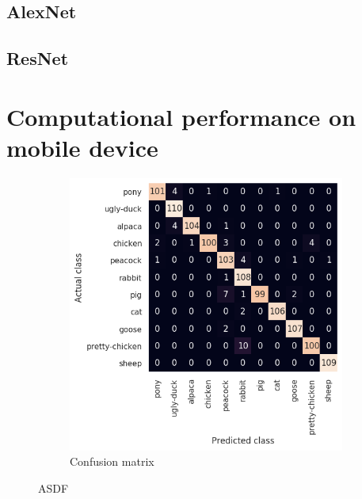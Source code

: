 \documentclass{l4proj}
\begin{document}
\subsection{AlexNet}

\subsection{ResNet}


\section{Computational performance on mobile device}


\begin{figure}[ht]
  \centering
  \begin{subfigure}[h!]{0.6\textwidth}
    \includegraphics[width=\textwidth]{images/evaluation/confusion/vis_fir_confusion.png}
    \caption{Confusion matrix}
    \label{fig:confusion}
  \end{subfigure}
  \caption{ASDF}
\end{figure}


\end{document}
